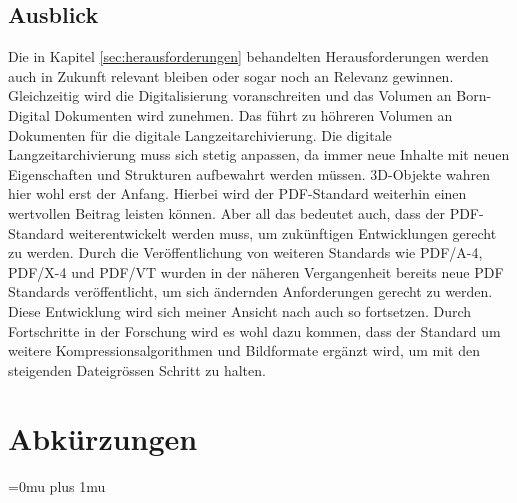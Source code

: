 \documentclass[a4paper,oneside, 12pt]{report}
\begin{document}
\section{Ausblick}
Die in Kapitel \ref{sec:herausforderungen} behandelten Herausforderungen werden auch in Zukunft relevant bleiben oder sogar noch an Relevanz gewinnen. Gleichzeitig wird die Digitalisierung voranschreiten und das Volumen an Born-Digital Dokumenten wird zunehmen. Das führt zu höhreren Volumen an Dokumenten für die digitale Langzeitarchivierung. Die digitale Langzeitarchivierung muss sich stetig anpassen, da immer neue Inhalte mit neuen Eigenschaften und Strukturen aufbewahrt werden müssen. 3D-Objekte wahren hier wohl erst der Anfang. Hierbei wird der PDF-Standard weiterhin einen wertvollen Beitrag leisten können. Aber all das bedeutet auch, dass der PDF-Standard weiterentwickelt werden muss, um zukünftigen Entwicklungen gerecht zu werden. Durch die Veröffentlichung von weiteren Standards wie PDF/A-4, PDF/X-4 und PDF/VT wurden in der näheren Vergangenheit bereits neue PDF Standards veröffentlicht, um sich ändernden Anforderungen gerecht zu werden. Diese Entwicklung wird sich meiner Ansicht nach auch so fortsetzen. Durch Fortschritte in der Forschung wird es wohl dazu kommen, dass der Standard um weitere Kompressionsalgorithmen und Bildformate ergänzt wird, um mit den steigenden Dateigrössen Schritt zu halten.


\cleardoublepage
{}
{}
\chapter*{Abkürzungen}
\begin{acronym}[Abkürzungen]
\end{acronym}

\cleardoublepage
{}
{}
\Urlmuskip=0mu plus 1mu\relax
\end{document}
